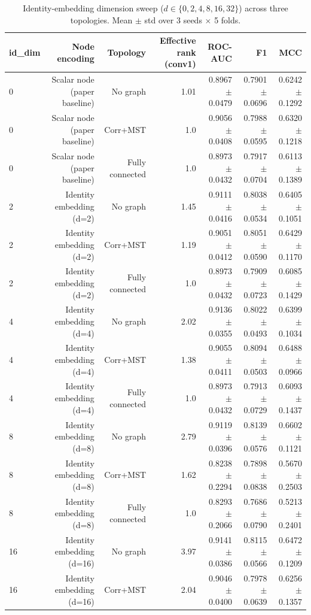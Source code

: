 \begin{table}[t]
\centering
\caption{Identity-embedding dimension sweep ($d\in\{0,2,4,8,16,32\}$) across three topologies. Mean $\pm$ std over 3 seeds $\times$ 5 folds.}
\label{tab:nodeidsweep}
\footnotesize
\begin{tabular}{lrrrrrr}
\toprule
id\_dim & Node encoding & Topology & Effective rank (conv1) & ROC-AUC & F1 & MCC \\
\midrule
0 & Scalar node (paper baseline) & No graph & 1.01 & 0.8967 $\pm$ 0.0479 & 0.7901 $\pm$ 0.0696 & 0.6242 $\pm$ 0.1292 \\
0 & Scalar node (paper baseline) & Corr+MST & 1.0 & 0.9056 $\pm$ 0.0408 & 0.7988 $\pm$ 0.0595 & 0.6320 $\pm$ 0.1218 \\
0 & Scalar node (paper baseline) & Fully connected & 1.0 & 0.8973 $\pm$ 0.0432 & 0.7917 $\pm$ 0.0704 & 0.6113 $\pm$ 0.1389 \\
2 & Identity embedding (d=2) & No graph & 1.45 & 0.9111 $\pm$ 0.0416 & 0.8038 $\pm$ 0.0534 & 0.6405 $\pm$ 0.1051 \\
2 & Identity embedding (d=2) & Corr+MST & 1.19 & 0.9051 $\pm$ 0.0412 & 0.8051 $\pm$ 0.0590 & 0.6429 $\pm$ 0.1170 \\
2 & Identity embedding (d=2) & Fully connected & 1.0 & 0.8973 $\pm$ 0.0432 & 0.7909 $\pm$ 0.0723 & 0.6085 $\pm$ 0.1429 \\
4 & Identity embedding (d=4) & No graph & 2.02 & 0.9136 $\pm$ 0.0355 & 0.8022 $\pm$ 0.0493 & 0.6399 $\pm$ 0.1034 \\
4 & Identity embedding (d=4) & Corr+MST & 1.38 & 0.9055 $\pm$ 0.0411 & 0.8094 $\pm$ 0.0503 & 0.6488 $\pm$ 0.0966 \\
4 & Identity embedding (d=4) & Fully connected & 1.0 & 0.8973 $\pm$ 0.0432 & 0.7913 $\pm$ 0.0729 & 0.6093 $\pm$ 0.1437 \\
8 & Identity embedding (d=8) & No graph & 2.79 & 0.9119 $\pm$ 0.0396 & 0.8139 $\pm$ 0.0576 & 0.6602 $\pm$ 0.1121 \\
8 & Identity embedding (d=8) & Corr+MST & 1.62 & 0.8238 $\pm$ 0.2294 & 0.7898 $\pm$ 0.0838 & 0.5670 $\pm$ 0.2503 \\
8 & Identity embedding (d=8) & Fully connected & 1.0 & 0.8293 $\pm$ 0.2066 & 0.7686 $\pm$ 0.0790 & 0.5213 $\pm$ 0.2401 \\
16 & Identity embedding (d=16) & No graph & 3.97 & 0.9141 $\pm$ 0.0386 & 0.8115 $\pm$ 0.0566 & 0.6472 $\pm$ 0.1209 \\
16 & Identity embedding (d=16) & Corr+MST & 2.04 & 0.9046 $\pm$ 0.0400 & 0.7978 $\pm$ 0.0639 & 0.6256 $\pm$ 0.1357 \\

\end{tabular}
\end{table}
